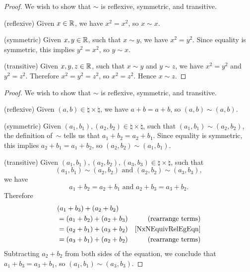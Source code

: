 \documentclass[../MATH-2000-Notes.tex]{subfiles}
\begin{document}
\begin{Answers}
    \item
    \begin{proof}
        We wish to show that $\sim$ is reflexive, symmetric, and transitive.

        (reflexive) Given $x \in \mathbb{R} $, we have $x^2 = x^2$, so $x \sim x$.

        (symmetric) Given $x,y \in \mathbb{R}$, such that $x \sim y$, we have $x^2 = y^2$. Since equality is symmetric, this implies $y^2 = x^2$, so $y \sim x$.

        (transitive) Given $x,y,z \in \mathbb{R}$, such that $x \sim y$ and $y \sim z$, we have $x^2 = y^2$ and $y^2 = z^2$. Therefore $x^2 = y^2 = z^2$, so $x^2 = z^2$. Hence $x \sim z$.
    \end{proof}
    \item
    \begin{proof}
        We wish to show that $\sim$ is reflexive, symmetric, and transitive.

        (reflexive) Given $(a,b) \in \natural \times \natural$, we have $a + b = a + b$, so $(a,b) \sim (a,b)$.

        (symmetric) Given $(a_1,b_1) , (a_2,b_2) \in \natural \times \natural$, such that $(a_1,b_1) \sim (a_2,b_2)$, the definition of~$\sim$ tells us that $a_1 +b_2 = a_2 + b_1$. Since equality is symmetric, this implies $a_2 + b_1 = a_1 + b_2$, so $(a_2,b_2) \sim (a_1,b_1)$.

        (transitive) Given $(a_1,b_1) , (a_2,b_2) , (a_3,b_3) \in \natural \times \natural$, such that
        $$ \text{$(a_1,b_1) \sim (a_2,b_2)$ \ and \  $(a_2,b_2) \sim (a_3,b_3)$} ,$$
        we have
        \begin{equation} \label{NxNEquivRelEgEqn}
            \text{$a_1 + b_2 = a_2 + b_1$ and $a_2 + b_3 = a_3 + b_2$.}
        \end{equation}
        Therefore
        \begin{align*}
            & (a_1 + b_3) + (a_2 + b_2) & 
            \\& = (a_1 + b_2) + (a_2 + b_3) & \text{(rearrange terms)} 
            \\&= (a_2 + b_1) + (a_3 + b_2) & \text{\ref{NxNEquivRelEgEqn}} 
            \\&= (a_3 + b_1) + (a_2 + b_2) & \text{(rearrange terms)}
        \end{align*}
        Subtracting $a_2 + b_2$ from both sides of the equation, we conclude that $a_1 + b_3 = a_3 + b_1$,
        so $(a_1,b_1) \sim (a_3,b_3)$.
    \end{proof}
\end{Answers}
\end{document}
